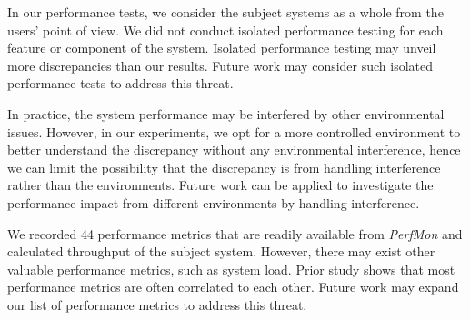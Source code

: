 	In our performance tests, we consider the subject systems as a whole from the users' point of view. We did not conduct isolated performance testing for each feature or component of the system. Isolated performance testing may unveil more discrepancies than our results. Future work may consider such isolated performance tests to address this threat.
	
	In practice, the system performance may be interfered by other environmental issues. However, in our experiments, we opt for a more controlled environment to better understand the discrepancy without any environmental interference, hence we can limit the possibility that the discrepancy is from handling interference rather than the environments. Future work can be applied to investigate the performance impact from different environments by handling interference.
	
	We recorded 44 performance metrics that are readily available from \emph{PerfMon} and calculated throughput of the subject system. However, there may exist other valuable performance metrics, such as system load. Prior study shows that most performance metrics are often correlated to each other\cite{Malik:2010:ACL:1955601.1955936}. Future work may expand our list of performance metrics to address this threat.
